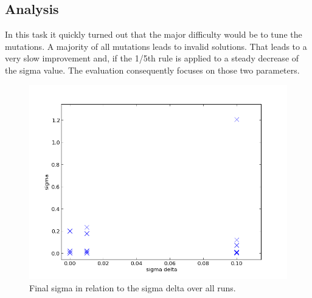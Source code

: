 \documentclass{scrartcl}
\begin{document}
\subsection{Analysis}
In this task it quickly turned out that the major difficulty would be to tune the mutations. A majority of all mutations leads to invalid solutions. That leads to a very slow improvement and, if the 1/5th rule is applied to a steady decrease of the sigma value. The evaluation consequently focuses on those two parameters.\\


\begin{figure}
 \center
 \includegraphics[width=.5\linewidth]{img/ex4/sigmas.png}
 \caption{Final sigma in relation to the sigma delta over all runs.}
\end{figure}
\end{document}
